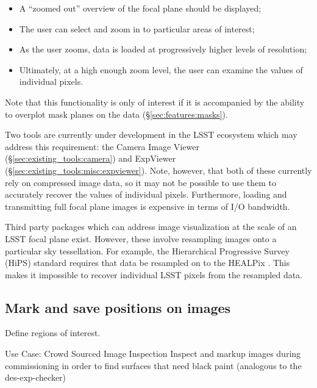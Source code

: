 \begin{itemize}

  \item{A ``zoomed out'' overview of the focal plane should be displayed;}
  \item{The user can select and zoom in to particular areas of interest;}
  \item{As the user zooms, data is loaded at progressively higher levels of resolution;}
  \item{Ultimately, at a high enough zoom level, the user can examine the values of individual pixels.}

\end{itemize}

Note that this functionality is only of interest if it is accompanied by the ability to overplot mask planes on the data (\S\ref{sec:features:masks}).

Two tools are currently under development in the LSST ecosystem which may address this requirement: the Camera Image Viewer (\S\ref{sec:existing_tools:camera}) and ExpViewer (\S\ref{sec:existing_tools:misc:expviewer}).
Note, however, that both of these currently rely on compressed image data, so it may not be possible to use them to accurately recover the values of individual pixels.
Furthermore, loading and transmitting full focal plane images is expensive in terms of I/O bandwidth.

Third party packages which can address image visualization at the scale of an LSST focal plane exist.
However, these involve resampling images onto a particular sky tessellation.
For example, the Hierarchical Progressive Survey (HiPS) standard \citep{2017ivoa.spec.0519F} requires that data be resampled on to the HEALPix \citep{gor05}.
This makes it impossible to recover individual LSST pixels from the resampled data.


\subsection{Mark and save positions on images}


Define regions of interest.

Use Case: Crowd Sourced Image Inspection
Inspect and markup images during commissioning in order to find surfaces that need black paint (analogous to the des-exp-checker)


